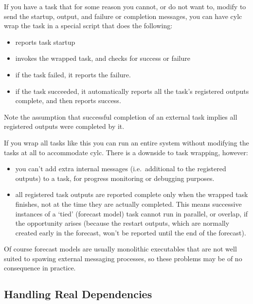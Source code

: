 \documentclass[11pt,a4paper]{article}
\begin{document}
If you have a task that for some reason you cannot, or do not want to,
modify to send the startup, output, and failure or completion messages, 
you can have cylc wrap the task in a special script that does the following:

\begin{itemize}
    \item reports task startup
    \item invokes the wrapped task, and checks for success or failure
    \item if the task failed, it reports the failure. 
    \item if the task succeeded, it automatically reports all the task's
        registered outputs complete, and then reports success.
\end{itemize}

Note the assumption that successful completion of an external task
implies all registered outputs were completed by it.

If you wrap all tasks like this you can run an entire system without
modifying the tasks at all to accommodate cylc. There is a downside to
task wrapping, however:

\begin{itemize}
    \item you can't add extra internal messages (i.e.\ additional to the
        registered outputs) to a task, for progress monitoring or
        debugging purposes.
    \item all registered task outputs are reported complete only
        when the wrapped task finishes, not at the time they are actually
        completed. This means successive instances of a `tied' (forecast
        model) task cannot run in parallel, or overlap, if the
        opportunity arises (because the restart outputs, which are
        normally created early in the forecast, won't be reported until
        the end of the forecast).
\end{itemize} 

Of course forecast models are usually monolithic executables that are not
well suited to spawing external messaging processes, so these problems
may be of no consequence in practice.

\pagebreak

\subsection{Handling Real Dependencies}
\label{HandlingRealDependencies}
\end{document}
